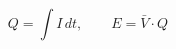 \documentclass[preview]{standalone}
\begin{document}
\[Q = \int I\,dt, \qquad E = \bar{V} \cdot Q\]
\end{document}
